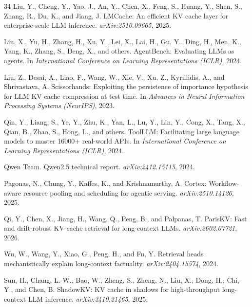 \documentclass{article}
\begin{document}
\begin{thebibliography}{34}
Liu, Y., Cheng, Y., Yao, J., An, Y., Chen, X., Feng, S., Huang, Y.,
  Shen, S., Zhang, R., Du, K., and Jiang, J.
\newblock LMCache: An efficient KV cache layer for enterprise-scale LLM
  inference.
\newblock \emph{arXiv:2510.09665}, 2025.

Liu, X., Yu, H., Zhang, H., Xu, Y., Lei, X., Lai, H., Gu, Y.,
  Ding, H., Men, K., Yang, K., Zhang, S., Deng, X., and others.
\newblock AgentBench: Evaluating LLMs as agents.
\newblock In \emph{International Conference on Learning
  Representations (ICLR)}, 2024.

Liu, Z., Desai, A., Liao, F., Wang, W., Xie, V., Xu, Z.,
  Kyrillidis, A., and Shrivastava, A.
\newblock Scissorhands: Exploiting the persistence of importance
  hypothesis for LLM KV cache compression at test time.
\newblock In \emph{Advances in Neural Information Processing Systems
  (NeurIPS)}, 2023.

Qin, Y., Liang, S., Ye, Y., Zhu, K., Yan, L., Lu, Y., Lin, Y.,
  Cong, X., Tang, X., Qian, B., Zhao, S., Hong, L., and others.
\newblock ToolLLM: Facilitating large language models to master
  16000+ real-world APIs.
\newblock In \emph{International Conference on Learning
  Representations (ICLR)}, 2024.

Qwen Team.
\newblock Qwen2.5 technical report.
\newblock \emph{arXiv:2412.15115}, 2024.

Pagonas, N., Chung, Y., Kaffes, K., and Krishnamurthy, A.
\newblock Cortex: Workflow-aware resource pooling and scheduling for
  agentic serving.
\newblock \emph{arXiv:2510.14126}, 2025.

Qi, Y., Chen, X., Jiang, H., Wang, Q., Peng, B., and Palpanas, T.
\newblock ParisKV: Fast and drift-robust KV-cache retrieval for
  long-context LLMs.
\newblock \emph{arXiv:2602.07721}, 2026.

Wu, W., Wang, Y., Xiao, G., Peng, H., and Fu, Y.
\newblock Retrieval heads mechanistically explain long-context factuality.
\newblock \emph{arXiv:2404.15574}, 2024.

Sun, H., Chang, L.-W., Bao, W., Zheng, S., Zheng, N., Liu, X., Dong,
  H., Chi, Y., and Chen, B.
\newblock ShadowKV: KV cache in shadows for high-throughput long-context
  LLM inference.
\newblock \emph{arXiv:2410.21465}, 2025.


\end{thebibliography}
\end{document}
